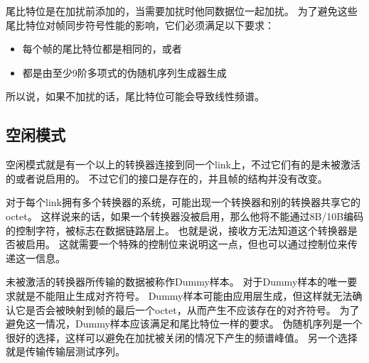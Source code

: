 \documentclass[UTF8]{ctexart}
\begin{document}
尾比特位是在加扰前添加的，当需要加扰时他同数据位一起加扰。
为了避免这些尾比特位对帧同步符号性能的影响，它们必须满足以下要求：

\begin{itemize}
	\item 每个帧的尾比特位都是相同的，或者
	\item 都是由至少9阶多项式的伪随机序列生成器生成
\end{itemize}

所以说，如果不加扰的话，尾比特位可能会导致线性频谱。

\subsection{空闲模式}

空闲模式就是有一个以上的转换器连接到同一个link上，不过它们有的是未被激活的或者说启用的。
不过它们的接口是存在的，并且帧的结构并没有改变。

对于每个link拥有多个转换器的系统，可能出现一个转换器和别的转换器共享它的octet。
这样说来的话，如果一个转换器没被启用，那么他将不能通过8B/10B编码的控制字符，被标志在数据链路层上。
也就是说，接收方无法知道这个转换器是否被启用。
这就需要一个特殊的控制位来说明这一点，但也可以通过控制位来传递这一信息。

未被激活的转换器所传输的数据被称作Dummy样本。
对于Dummy样本的唯一要求就是不能阻止生成对齐符号。
Dummy样本可能由应用层生成，但这样就无法确认它是否会被映射到帧的最后一个octet，从而产生不应该存在的对齐符号。
为了避免这一情况，Dummy样本应该满足和尾比特位一样的要求。
伪随机序列是一个很好的选择，这样可以避免在加扰被关闭的情况下产生的频谱峰值。
另一个选择就是传输传输层测试序列。



\end{document}
